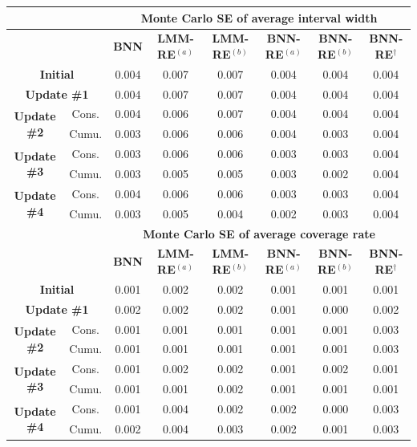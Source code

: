 \begin{tabular}{cc|cccccc}
\hline
 & & \multicolumn{6}{c}{\textbf{Monte Carlo SE of average interval width}} \\
\hline
 & & \textbf{BNN} & \textbf{LMM-RE}$^{(a)}$ & \textbf{LMM-RE}$^{(b)}$ & \textbf{BNN-RE}$^{(a)}$ & \textbf{BNN-RE}$^{(b)}$ & \textbf{BNN-RE}$^{\dagger}$ \\
\hline
\multicolumn{2}{c|}{\textbf{Initial}} & 0.004 & 0.007 & 0.007 & 0.004 & 0.004 & 0.004 \\
\multicolumn{2}{c|}{\textbf{Update \#1}} & 0.004 & 0.007 & 0.007 & 0.004 & 0.004 & 0.004 \\
\multirow{2}{*}{\textbf{Update \#2}} & Cons. & 0.004 & 0.006 & 0.007 & 0.004 & 0.004 & 0.004 \\
 & Cumu. & 0.003 & 0.006 & 0.006 & 0.004 & 0.003 & 0.004 \\
\multirow{2}{*}{\textbf{Update \#3}} & Cons. & 0.003 & 0.006 & 0.006 & 0.003 & 0.003 & 0.004 \\
 & Cumu. & 0.003 & 0.005 & 0.005 & 0.003 & 0.002 & 0.004 \\
\multirow{2}{*}{\textbf{Update \#4}} & Cons. & 0.004 & 0.006 & 0.006 & 0.003 & 0.003 & 0.004 \\
 & Cumu. & 0.003 & 0.005 & 0.004 & 0.002 & 0.003 & 0.004 \\
\hline
 & & \multicolumn{6}{c}{\textbf{Monte Carlo SE of average coverage rate}} \\
\hline
 & & \textbf{BNN} & \textbf{LMM-RE}$^{(a)}$ & \textbf{LMM-RE}$^{(b)}$ & \textbf{BNN-RE}$^{(a)}$ & \textbf{BNN-RE}$^{(b)}$ & \textbf{BNN-RE}$^{\dagger}$ \\
\hline
\multicolumn{2}{c|}{\textbf{Initial}} & 0.001 & 0.002 & 0.002 & 0.001 & 0.001 & 0.001 \\
\multicolumn{2}{c|}{\textbf{Update \#1}} & 0.002 & 0.002 & 0.002 & 0.001 & 0.000 & 0.002 \\
\multirow{2}{*}{\textbf{Update \#2}} & Cons. & 0.001 & 0.001 & 0.001 & 0.001 & 0.001 & 0.003 \\
 & Cumu. & 0.001 & 0.001 & 0.001 & 0.001 & 0.001 & 0.003 \\
\multirow{2}{*}{\textbf{Update \#3}} & Cons. & 0.001 & 0.002 & 0.002 & 0.001 & 0.002 & 0.001 \\
 & Cumu. & 0.001 & 0.001 & 0.002 & 0.001 & 0.001 & 0.001 \\
\multirow{2}{*}{\textbf{Update \#4}} & Cons. & 0.001 & 0.004 & 0.002 & 0.002 & 0.000 & 0.003 \\
 & Cumu. & 0.002 & 0.004 & 0.003 & 0.002 & 0.001 & 0.003 \\
\hline
\end{tabular}